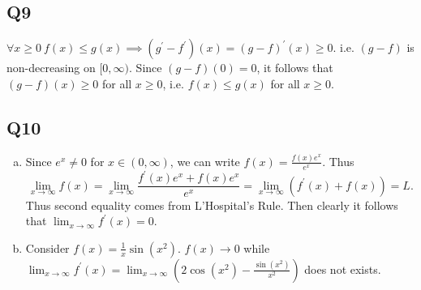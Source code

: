 \documentclass[12pt,lettersize]{article}
\begin{document}
	\subsection*{Q9}
	$\forall x\geq 0\ f(x)\leq g(x)\implies (g^\prime-f^\prime)(x)=(g-f)^\prime(x)\geq 0$. i.e. $(g-f)$ is non-decreasing on $[0,\infty)$. Since $(g-f)(0)=0$, it follows that $(g-f)(x)\geq0$ for all $x\geq 0$, i.e. $f(x)\leq g(x)$ for all $x\geq 0$.
	\newpage
	
	\subsection*{Q10}
	\begin{enumerate}[(a)]
		\item Since $e^x\neq0$ for $x\in(0,\infty)$, we can write $f(x)=\frac{f(x)e^x}{e^x}$. Thus
		\begin{displaymath}
			\lim_{x\rightarrow\infty}f(x)=\lim_{x\rightarrow\infty}\frac{f^\prime(x)e^x+f(x)e^x}{e^x}=\lim_{x\rightarrow\infty}(f^\prime(x)+f(x))=L.
		\end{displaymath}
		Thus second equality comes from L'Hospital's Rule. Then clearly it follows that $\lim_{x\rightarrow\infty}f^\prime(x)=0$.
		\item Consider $f(x)=\frac{1}{x}\sin(x^2)$. $f(x)\rightarrow0$ while $\lim_{x\rightarrow\infty}f^\prime(x)=\lim_{x\rightarrow\infty}\left(2\cos(x^2)-\frac{\sin(x^2)}{x^2}\right)$ does not exists.
	\end{enumerate}
	\newpage
	
\end{document}
